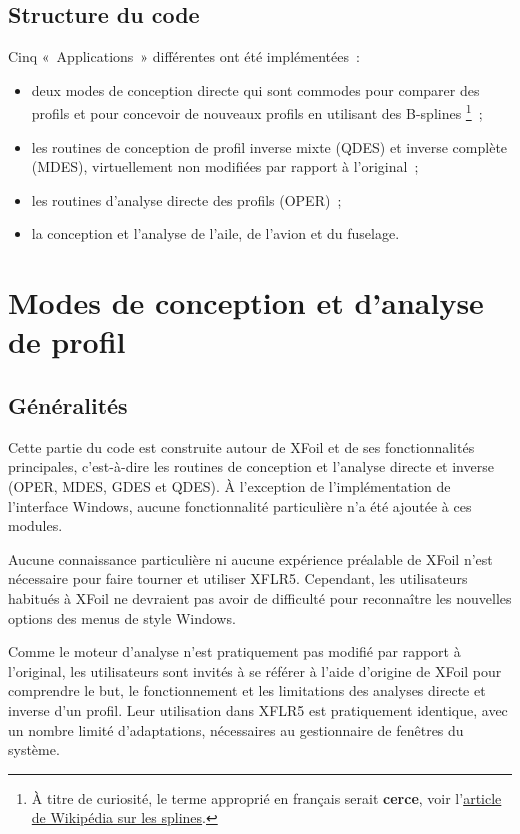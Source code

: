 \documentclass[a4paper,twoside,12pt,dvips]{article}
\begin{document}
\subsection{Structure du code}

Cinq «~Applications~» différentes ont été implémentées~: 
\begin{itemize}
	\item deux modes de conception directe qui sont commodes pour comparer des
	profils et pour concevoir de nouveaux profils en utilisant des B-splines
	\footnote{À titre de curiosité, le terme approprié en français serait 
	\textbf{cerce}, voir l’\href{https://fr.wikipedia.org/wiki/Spline} {article
	de Wikipédia sur les splines}.}~;
	\item les routines de conception de profil inverse mixte (QDES) et inverse
	complète (MDES), virtuellement non modifiées par rapport à l’original~;
	\item les routines d’analyse directe des profils (OPER)~;
	\item la conception et l’analyse de l’aile, de l’avion et du fuselage.
\end{itemize}

\clearpage


\section{Modes de conception et d’analyse de profil}

\subsection{Généralités}

Cette partie du code est construite autour de XFoil et de ses fonctionnalités 
principales, c’est-à-dire les routines de conception et l’analyse directe et 
inverse (OPER, MDES, GDES et QDES). À l’exception de l’implémentation de 
l’interface Windows, aucune fonctionnalité particulière n’a été ajoutée à ces 
modules. 

Aucune connaissance particulière ni aucune expérience préalable de XFoil n’est nécessaire pour faire tourner et utiliser XFLR5. Cependant, les utilisateurs habitués à XFoil ne devraient pas avoir de difficulté pour reconnaître les nouvelles options des menus de style Windows. 

Comme le moteur d’analyse n’est pratiquement pas modifié par rapport à l’original, les utilisateurs sont invités à se référer à l’aide d’origine de XFoil pour comprendre le but, le fonctionnement et les limitations des analyses directe et inverse d’un profil. Leur utilisation dans XFLR5 est pratiquement identique, avec un nombre limité d’adaptations, nécessaires au gestionnaire de fenêtres du système.
\end{document}

